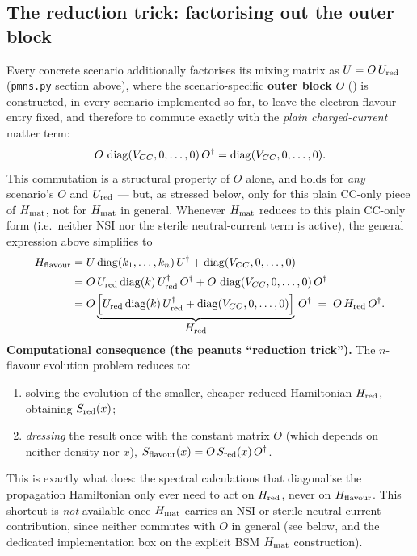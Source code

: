 \begin{theorybox}
\subsection*{The reduction trick: factorising out the outer block}
Every concrete  scenario additionally factorises its mixing
matrix as $U = O\,U_{\rm red}$ (\texttt{pmns.py} section above), where the
scenario-specific \textbf{outer block} $O$ () is
constructed, in every scenario implemented so far, to leave the electron
flavour entry fixed, and therefore to commute exactly with the
\emph{plain charged-current} matter term:
\begin{equation}
  O\,\operatorname{diag}(V_{CC},0,\dots,0)\,O^\dagger = \operatorname{diag}(V_{CC},0,\dots,0).
\end{equation}
This commutation is a structural property of $O$ alone, and holds for
\emph{any} scenario's $O$ and $U_{\rm red}$ --- but, as stressed below, only
for this plain CC-only piece of $H_{\rm mat}$, not for $H_{\rm mat}$ in
general. Whenever $H_{\rm mat}$ reduces to this plain CC-only form (i.e.\
neither NSI nor the sterile neutral-current term is active), the general
expression above simplifies to
\begin{align}
  H_{\rm flavour} &= U \operatorname{diag}(k_1,\dots,k_n)\, U^\dagger + \operatorname{diag}(V_{CC},0,\dots,0) \nonumber\\
  &= O\,U_{\rm red}\operatorname{diag}(k)\,U_{\rm red}^\dagger\,O^\dagger + O\,\operatorname{diag}(V_{CC},0,\dots,0)\,O^\dagger \nonumber\\
  &= O \underbrace{\Bigl[U_{\rm red}\operatorname{diag}(k)\,U_{\rm red}^\dagger + \operatorname{diag}(V_{CC},0,\dots,0)\Bigr]}_{\displaystyle H_{\rm red}}\, O^\dagger
  \;=\; O\, H_{\rm red}\, O^\dagger.
  \label{eq:H-factorization}
\end{align}
\textbf{Computational consequence (the peanuts ``reduction trick'').} The
$n$-flavour evolution problem reduces to:
\begin{enumerate}
  \item solving the evolution of the smaller, cheaper reduced Hamiltonian
    $H_{\rm red}$, obtaining $S_{\rm red}(x)$;
  \item \emph{dressing} the result once with the constant matrix $O$ (which
    depends on neither density nor $x$),
    $S_{\rm flavour}(x) = O\, S_{\rm red}(x)\, O^\dagger$.
\end{enumerate}
This is exactly what
 does: the spectral calculations that
diagonalise the propagation Hamiltonian only ever need to act on
$H_{\rm red}$, never on $H_{\rm flavour}$. This shortcut is \emph{not}
available once $H_{\rm mat}$ carries an NSI or sterile neutral-current
contribution, since neither commutes with $O$ in general (see below, and
the dedicated implementation box on the explicit BSM $H_{\rm mat}$
construction).


\end{theorybox}
